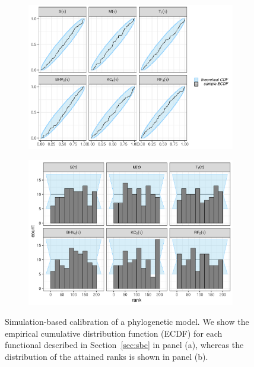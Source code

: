 \documentclass[oneside]{article}
\begin{document}
\begin{figure}
  \centering
  \vspace{0pt}
  \begin{subfigure}[t]{\textwidth}
    \caption{}
    \centering
    \includegraphics[scale=0.5]{../figures/ECDFs_SBC.pdf} 
  \end{subfigure}
  \vspace{0pt}
  \hspace{1cm}
  \begin{subfigure}[t]{\textwidth}
    \caption{}
    \centering
    \includegraphics[scale=0.5]{../figures/hists_SBC.pdf}    
  \end{subfigure}
  \hfill
   \caption{Simulation-based calibration of a phylogenetic model.
   We show the empirical cumulative distribution function (ECDF) for each functional described in Section~\ref{sec:sbc} in panel (a), whereas the distribution of the attained ranks is shown in panel (b).}
  \label{fig:sbc}
\end{figure}
\end{document}
